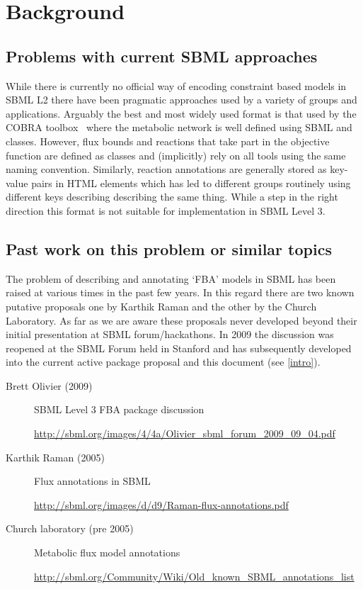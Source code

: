 
\section{ Background }
\label{background}

\subsection{ Problems with current SBML approaches }

While there is currently no official way of encoding constraint based models in SBML L2 there have been pragmatic approaches used by a variety of groups and applications. Arguably the best and most widely used format is that used by the \textsf{COBRA toolbox}~\citep{cobra} where the metabolic network is well defined using SBML \Reaction and \Species classes. However, flux bounds and reactions that take part in the objective function are defined as \LocalParameter classes and (implicitly) rely on all tools using the same naming convention. Similarly, reaction annotations are generally stored as key-value pairs in HTML \Notes elements which has led to different groups routinely using different keys describing describing the same thing. While a step in the right direction this format is not suitable for implementation in SBML Level 3.


\subsection{ Past work on this problem or similar topics }
The problem of describing and annotating `FBA' models in SBML has been raised  at various times in the past few years. In this regard there are two known putative proposals one by Karthik Raman and the other by the Church Laboratory. As far as we are aware these proposals never developed beyond their initial presentation at SBML forum/hackathons. In 2009 the discussion was reopened at the SBML Forum held in Stanford and has subsequently developed into the current active package proposal and this document (see \ref{intro}).

\begin{description}
  \item[Brett Olivier (2009)] SBML Level 3 FBA package discussion
  \item[]\url{http://sbml.org/images/4/4a/Olivier_sbml_forum_2009_09_04.pdf}
  \item[Karthik Raman (2005)] Flux annotations in SBML
  \item[]\url{http://sbml.org/images/d/d9/Raman-flux-annotations.pdf}
  \item[Church laboratory (pre 2005)] Metabolic flux model annotations
  \item[]\url{http://sbml.org/Community/Wiki/Old_known_SBML_annotations_list}
\end{description}



